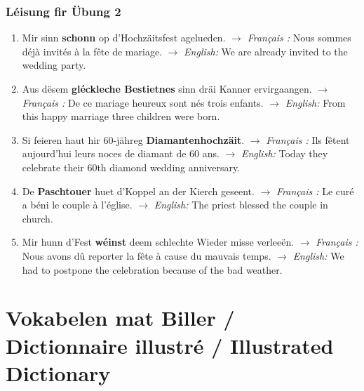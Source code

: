 \subsubsection*{Léisung fir Übung 2}
\begin{enumerate}
    \item Mir sinn \textbf{schonn} op d'Hochzäitsfest agelueden.
    $\rightarrow$ \textit{Français :} Nous sommes déjà invités à la fête de mariage.
    $\rightarrow$ \textit{English:} We are already invited to the wedding party.

    \item Aus dësem \textbf{gléckleche Bestietnes} sinn dräi Kanner ervirgaangen.
    $\rightarrow$ \textit{Français :} De ce mariage heureux sont nés trois enfants.
    $\rightarrow$ \textit{English:} From this happy marriage three children were born.

    \item Si feieren haut hir 60-jähreg \textbf{Diamantenhochzäit}.
    $\rightarrow$ \textit{Français :} Ils fêtent aujourd'hui leurs noces de diamant de 60 ans.
    $\rightarrow$ \textit{English:} Today they celebrate their 60th diamond wedding anniversary.

    \item De \textbf{Paschtouer} huet d'Koppel an der Kierch geseent.
    $\rightarrow$ \textit{Français :} Le curé a béni le couple à l'église.
    $\rightarrow$ \textit{English:} The priest blessed the couple in church.

    \item Mir hunn d'Fest \textbf{wéinst} deem schlechte Wieder misse verleeën.
    $\rightarrow$ \textit{Français :} Nous avons dû reporter la fête à cause du mauvais temps.
    $\rightarrow$ \textit{English:} We had to postpone the celebration because of the bad weather.
\end{enumerate}

\vspace{2em}

\section[Vokabelen mat Biller / Picture Dictionary]{Vokabelen mat Biller / Dictionnaire illustré / Illustrated Dictionary}

